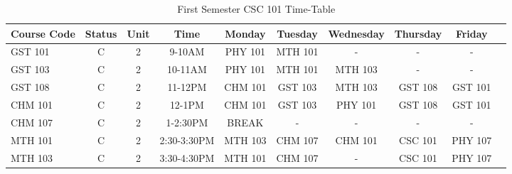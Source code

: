 \documentclass{article}
\begin{document}
	\begin{sidewaystable}[h!]
		\begin{center}
			\caption{First Semester CSC 101 Time-Table}
			\label{tab:Table 1}
			\begin{tabular}
				{|l|c|c|c|c|c|c|c|c|r|}
				\cellcolor{blue!10}\textbf{Course Code} & \cellcolor{green!10}\textbf{Status} & \cellcolor{red!10}\textbf{Unit} & \cellcolor{red!62}\textbf{Time} & \cellcolor{green!62}\textbf{Monday} & \cellcolor{blue!62}\textbf{Tuesday} 
			& \cellcolor{blue!10}\textbf{Wednesday} & \cellcolor{green!10}\textbf{Thursday}	&\cellcolor{red!10} \textbf{Friday}\\
				\hline
			\cellcolor{blue!15}GST 101 & \cellcolor{green!15}C & \cellcolor{red!15}2 & \cellcolor{red!60}9-10AM & \cellcolor{green!60}PHY 101 & \cellcolor{blue!60}MTH 101 & \cellcolor{blue!15}- & \cellcolor{green!15}- & \cellcolor{red!15}-\\
			\cellcolor{blue!20}GST 103 & \cellcolor{green!20}C & \cellcolor{red!20}2 & \cellcolor{red!55}10-11AM & \cellcolor{green!55}PHY 101 &  \cellcolor{blue!55}MTH 101 & \cellcolor{blue!15}MTH 103 & \cellcolor{green!15}- & \cellcolor{red!15}-\\
			\cellcolor{blue!25}GST 108 & \cellcolor{green!25}C & \cellcolor{red!25}2 & \cellcolor{red!50}11-12PM &	\cellcolor{green!50}CHM 101 &  \cellcolor{blue!50}GST 103 & \cellcolor{blue!15}MTH 103 & \cellcolor{green!15}GST 108 & \cellcolor{red!15}GST 101\\
				\cellcolor{blue!30}CHM 101 & \cellcolor{green!30}C & \cellcolor{red!30}2 & \cellcolor{red!45}12-1PM & \cellcolor{green!45}CHM 101 &  \cellcolor{blue!45}GST 103 & \cellcolor{blue!15}PHY 101 & \cellcolor{green!15}GST 108 & \cellcolor{red!15}GST 101\\
				\cellcolor{blue!35}CHM 107 & \cellcolor{green!35}C & \cellcolor{red!35}2 & \cellcolor{red!40}1-2:30PM & \cellcolor{green!40}BREAK &  \cellcolor{blue!40}- & \cellcolor{blue!15}- & \cellcolor{green!15}- & \cellcolor{red!15}-\\
				\cellcolor{blue!40}MTH 101 & \cellcolor{green!40}C & \cellcolor{red!40}2 & \cellcolor{red!35}2:30-3:30PM & \cellcolor{green!35}MTH 103	&  \cellcolor{blue!35}CHM 107 & \cellcolor{blue!15}CHM 101 & \cellcolor{green!15}CSC 101 & \cellcolor{red!15}PHY 107\\
				\cellcolor{blue!45}MTH 103 & \cellcolor{green!45}C & \cellcolor{red!45}2 & \cellcolor{red!30}3:30-4:30PM & \cellcolor{green!30}MTH 101 &  \cellcolor{blue!30}CHM 107 & \cellcolor{blue!15}- & \cellcolor{green!15}CSC 101 & \cellcolor{red!15}PHY 107\\

\end{tabular}
\end{center}
\end{sidewaystable}
\end{document}
